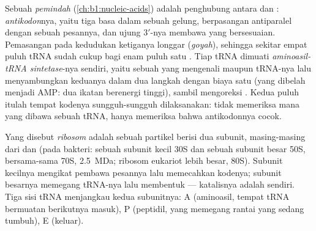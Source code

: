 \begin{definition}\label{def:b1:gene-expression:trna}
Sebuah \emph{ pemindah} (\cref{ch:b1:nucleic-acids}) adalah
penghubung antara  dan : \emph{antikodon}nya, yaitu tiga
basa dalam sebuah gelung, berpasangan antiparalel dengan sebuah 
pesannya, dan ujung $3'$-nya membawa  yang bersesuaian.
Pemasangan pada kedudukan  ketiganya longgar (\emph{goyah}),
sehingga sekitar empat puluh tRNA sudah cukup bagi enam puluh satu
. Tiap tRNA dimuati \emph{aminoasil-tRNA sintetase}-nya
sendiri, yaitu sebuah  yang mengenali  maupun
tRNA-nya lalu menyambungkan keduanya dalam dua langkah dengan biaya
satu  (yang dibelah menjadi AMP: dua ikatan berenergi tinggi),
sambil mengoreksi . Kedua puluh  itulah tempat
kodenya sungguh-sungguh dilaksanakan:  tidak memeriksa  mana yang dibawa sebuah tRNA, hanya memeriksa bahwa antikodonnya
cocok.
\end{definition}

\begin{definition}[Ribosom]\label{def:b1:gene-expression:ribosome}
Yang disebut \emph{ribosom} adalah sebuah partikel berisi dua subunit,
masing-masing dari  dan  (pada bakteri: sebuah
subunit kecil 30S dan sebuah subunit besar 50S, bersama-sama 70S,
\qty{2.5}{MDa}; ribosom eukariot lebih besar, 80S). Subunit kecilnya
mengikat pembawa pesannya lalu memecahkan kodenya; subunit besarnya
memegang tRNA-nya lalu membentuk  --- katalisnya
adalah  sendiri. Tiga sisi tRNA menjangkau kedua
subunitnya: A (aminoasil, tempat tRNA bermuatan berikutnya masuk), P
(peptidil, yang memegang rantai yang sedang tumbuh), E (keluar).
\end{definition}

